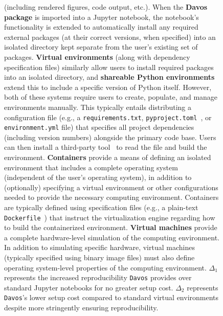 \documentclass[preprint,12pt,a4paper]{elsarticle}
\begin{document}
\begin{figure}[tp]
{(including rendered figures, code output, etc.). When the \textbf{Davos
package} is imported into a Jupyter notebook, the notebook's functionality is
extended to automatically install any required external packages (at their
correct versions, when specified) into an isolated directory kept separate from
the user's existing set of packages. \textbf{Virtual environments} (along with
dependency specification files) similarly allow users to install required
packages into an isolated directory, and \textbf{shareable Python environments}
extend this to include a specific version of Python itself. However, both of
these systems require users to create, populate, and manage environments
manually. This typically entails distributing a configuration file (e.g., a
\texttt{requirements.txt}, \texttt{pyproject.toml}~\cite{CannEtal16}, or
\texttt{environment.yml} file) that specifies all project dependencies
(including version numbers) alongside the primary code base. Users can then
install a third-party tool~\cite[e.g.,][]{BickEtal07, Eust19, Anac12} to read
the file and build the environment. \textbf{Containers} provide a means of
defining an isolated environment that includes a complete operating system
(independent of the user's operating system), in addition to (optionally)
specifying a virtual environment or other configurations needed to provide the
necessary computing environment. Containers are typically defined using
specification files (e.g., a plain-text \texttt{Dockerfile}~\cite{Merk14}) that
instruct the virtualization engine regarding how to build the containerized
environment. \textbf{Virtual machines} provide a complete hardware-level
simulation of the computing environment. In addition to simulating specific
hardware, virtual machines (typically specified using binary image files) must
also define operating system-level properties of the computing environment.
$\Delta_1$ represents the increased reproducibility \texttt{Davos} provides
over standard Jupyter notebooks for no greater setup cost. $\Delta_2$
represents \texttt{Davos}'s lower setup cost compared to standard virtual
environments despite more stringently ensuring reproducibility.}
\label{fig:code-sharing} \end{figure}
\end{document}
